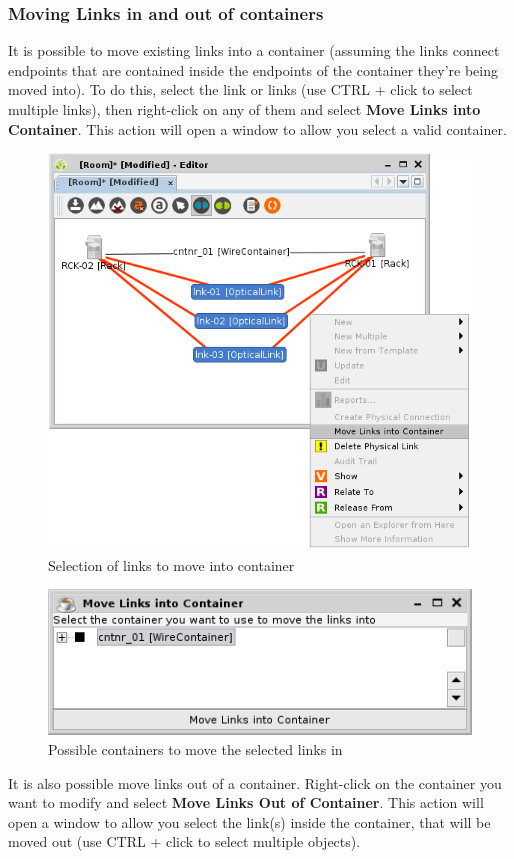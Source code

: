 \documentclass[a4paper]{article}
\begin{document}
			\subsubsection{Moving Links in and out of containers} \label{sec:move_physical_links}
				It is possible to move existing links into a container (assuming the links connect endpoints that are contained inside the endpoints of the container they're being moved into). To do this, select the link or links (use CTRL + click to select multiple links), then right-click on any of them and select \textbf{Move Links into Container}. This action will open a window to allow you select a valid container.
				\begin{figure}[h!]
					\centering
					\includegraphics[width=0.6\linewidth]{img/l1_selected_links_to_move_into_container.png}
					\caption{Selection of links to move into container}
					\label{fig:l1_selected_links_to_move_into_container}
				\end{figure}	

				\begin{figure}[h!]
					\centering
					\includegraphics[width=0.6\linewidth]{img/l1_list_of_existing_containers.png}
					\caption{Possible containers to move the selected links in}
					\label{fig:l1_list_of_existing_containers}
				\end{figure}	
	            \clearpage	
				It is also possible move links out of a container. Right-click on the container you want to modify and select \textbf{Move Links Out of Container}. This action will open a window to allow you select the link(s) inside the container, that will be moved out (use CTRL + click to select multiple objects).
			
\end{document}
